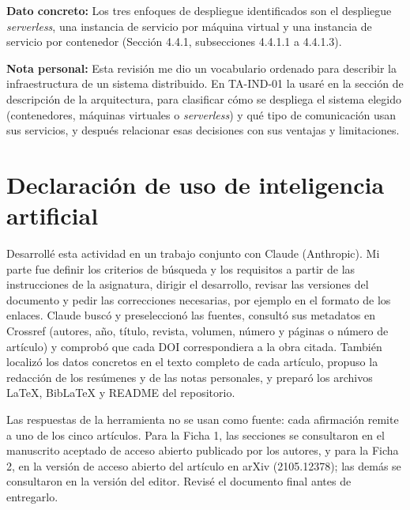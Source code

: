 \documentclass[11pt,a4paper]{article}
\newcommand{\campo}[1]{\par\textbf{#1}\enspace}
\begin{document}
\campo{Dato concreto:} Los tres enfoques de despliegue identificados son el despliegue \emph{serverless}, una instancia de servicio por máquina virtual y una instancia de servicio por contenedor (Sección 4.4.1, subsecciones 4.4.1.1 a 4.4.1.3).

\campo{Nota personal:} Esta revisión me dio un vocabulario ordenado para describir la infraestructura de un sistema distribuido. En TA-IND-01 la usaré en la sección de descripción de la arquitectura, para clasificar cómo se despliega el sistema elegido (contenedores, máquinas virtuales o \emph{serverless}) y qué tipo de comunicación usan sus servicios, y después relacionar esas decisiones con sus ventajas y limitaciones.

\section*{Declaración de uso de inteligencia artificial}

Desarrollé esta actividad en un trabajo conjunto con Claude (Anthropic). Mi parte fue definir los criterios de búsqueda y los requisitos a partir de las instrucciones de la asignatura, dirigir el desarrollo, revisar las versiones del documento y pedir las correcciones necesarias, por ejemplo en el formato de los enlaces. Claude buscó y preseleccionó las fuentes, consultó sus metadatos en Crossref (autores, año, título, revista, volumen, número y páginas o número de artículo) y comprobó que cada DOI correspondiera a la obra citada. También localizó los datos concretos en el texto completo de cada artículo, propuso la redacción de los resúmenes y de las notas personales, y preparó los archivos LaTeX, BibLaTeX y README del repositorio.

Las respuestas de la herramienta no se usan como fuente: cada afirmación remite a uno de los cinco artículos. Para la Ficha 1, las secciones se consultaron en el manuscrito aceptado de acceso abierto publicado por los autores, y para la Ficha 2, en la versión de acceso abierto del artículo en arXiv (2105.12378); las demás se consultaron en la versión del editor. Revisé el documento final antes de entregarlo.

\printbibliography[title={Referencias}]
\end{document}
